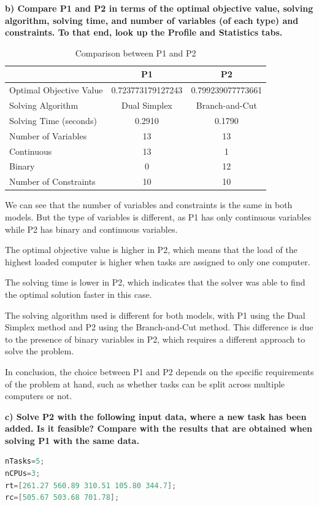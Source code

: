 \documentclass{article}
\begin{document}
\bigskip

\textbf{b) Compare P1 and P2 in terms of the optimal objective value, solving algorithm, solving time, and number of variables (of each type) and constraints. To that end, look up the Profile and Statistics tabs.} 

\begin{table}[ht]
\centering
\caption{Comparison between P1 and P2}
\label{tab:comparison}
\small
\begin{tabular}{l|c|c}
 & \textbf{P1} & \textbf{P2} \\
\hline
Optimal Objective Value & 0.723773179127243 & 0.799239077773661 \\
\hline
Solving Algorithm       & Dual Simplex      & Branch-and-Cut \\
\hline
Solving Time (seconds)  & 0.2910            & 0.1790 \\
\hline
Number of Variables     & 13                & 13 \\
\quad Continuous        & 13                & 1 \\
\quad Binary            & 0                 & 12 \\
\hline
Number of Constraints   & 10                & 10 \\
\end{tabular}
\end{table}

We can see that the number of variables and constraints is the same in both models. But the type of variables is different, as P1 has only continuous variables while P2 has binary and continuous variables. 

The optimal objective value is higher in P2, which means that the load of the highest loaded computer is higher when tasks are assigned to only one computer. 

The solving time is lower in P2, which indicates that the solver was able to find the optimal solution faster in this case.

The solving algorithm used is different for both models, with P1 using the Dual Simplex method and P2 using the Branch-and-Cut method. This difference is due to the presence of binary variables in P2, which requires a different approach to solve the problem.

In conclusion, the choice between P1 and P2 depends on the specific requirements of the problem at hand, such as whether tasks can be split across multiple computers or not.
\newpage

\textbf{c) Solve P2 with the following input data, where a new task has been added. Is it feasible? Compare with the results that are obtained when solving P1 with the same data.}
\smallskip
\begin{lstlisting}[language=Java, frame=single, xleftmargin=0pt]
nTasks=5;
nCPUs=3;
rt=[261.27 560.89 310.51 105.80 344.7];
rc=[505.67 503.68 701.78];
\end{lstlisting}
\smallskip
\end{document}
